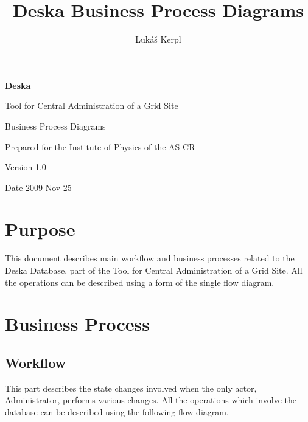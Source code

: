 \documentclass[12pt]{article}
\author{Lukáš Kerpl}
\title{Deska Business Process Diagrams}
\begin{document}
{\Huge \textbf{Deska}}

\vspace{0.2in}

{\large Tool for Central Administration of a Grid Site}

\vspace{0.5in}

{\large Business Process Diagrams}

\vspace{0.2in}

{\large Prepared for the Institute of Physics of the AS CR}

\vspace{0.2in}

{\large Version 1.0}

\vspace{0.2in}

{\large Date 2009-Nov-25}

\vspace{0.5in}

\tableofcontents

\newpage


\section{Purpose}
This document describes main workflow and business processes related to the
Deska Database, part of the Tool for Central Administration of a Grid Site.
All the operations can be described using a form of the single flow diagram.


\section{Business Process}

\subsection{Workflow}
This part describes the state changes involved when the only actor,
Administrator, performs various changes.  All the operations which involve the
database can be described using the following flow diagram.
\end{document}
